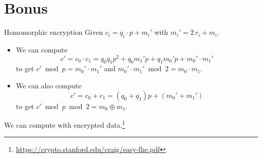 \documentclass[presentation,smaller]{beamer}
\begin{document}
\section{Bonus}
\label{sec:org0cd8465}

\begin{frame}[label={sec:orgc1dbe83}]{Homomorphic encryption}
Given \(c_i = q_i ⋅ p + m_i'\) with \(m_i' = 2\,r_i + m_i\).
\begin{itemize}
\item We can compute \[c' = c_0 ⋅ c_1 = q_0 q_1 p^2 + q_0 m_1' p  + q_1 m_0' p + m_0' ⋅ m_1'\] to get \(c' \bmod p =  m_0' ⋅ m_1'\) and \(m_0' ⋅ m_1' \bmod 2 = m_0 ⋅ m_1\).
\item We can also compute \[c' = c_0 + c_1 = (q_0 + q_1) p + (m_0' + m_1')\] to get \(c' \bmod p \bmod 2 = m_0 \oplus m_1\).
\end{itemize}

We can compute with encrypted data.\footnote{\url{https://crypto.stanford.edu/craig/easy-fhe.pdf}}
\end{frame}
\end{document}
